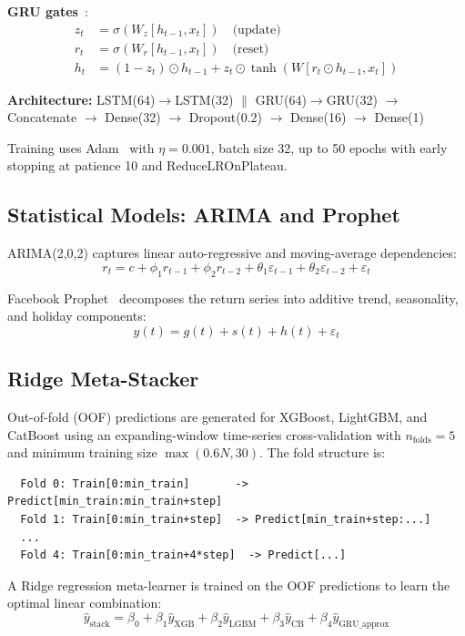\documentclass[10pt,a4paper,twoside]{article}
\begin{document}
\textbf{GRU gates}~\cite{cho2014}:
\begin{align}
  z_t &= \sigma(W_z [h_{t-1}, x_t]) \quad\text{(update)} \\
  r_t &= \sigma(W_r [h_{t-1}, x_t]) \quad\text{(reset)} \\
  h_t &= (1-z_t) \odot h_{t-1} + z_t \odot \tanh(W[r_t \odot h_{t-1}, x_t])
\end{align}

\textbf{Architecture:}
LSTM(64)$\to$LSTM(32) $\|$ GRU(64)$\to$GRU(32) $\to$ Concatenate $\to$ Dense(32) $\to$ Dropout(0.2) $\to$ Dense(16) $\to$ Dense(1)

Training uses Adam~\cite{kingma2015} with $\eta = 0.001$, batch size 32, up to 50 epochs with
early stopping at patience 10 and ReduceLROnPlateau.

\subsection{Statistical Models: ARIMA and Prophet}

ARIMA(2,0,2) captures linear auto-regressive and moving-average dependencies:
\begin{equation}
  r_t = c + \phi_1 r_{t-1} + \phi_2 r_{t-2}
          + \theta_1 \varepsilon_{t-1} + \theta_2 \varepsilon_{t-2} + \varepsilon_t
\end{equation}

Facebook Prophet~\cite{taylor2018} decomposes the return series into additive
trend, seasonality, and holiday components:
\begin{equation}
  y(t) = g(t) + s(t) + h(t) + \varepsilon_t
\end{equation}

\subsection{Ridge Meta-Stacker}

Out-of-fold (OOF) predictions are generated for XGBoost, LightGBM, and CatBoost
using an expanding-window time-series cross-validation with $n_{\text{folds}}=5$
and minimum training size $\max(0.6N, 30)$. The fold structure is:
{\small
\begin{verbatim}
  Fold 0: Train[0:min_train]       -> Predict[min_train:min_train+step]
  Fold 1: Train[0:min_train+step]  -> Predict[min_train+step:...]
  ...
  Fold 4: Train[0:min_train+4*step]  -> Predict[...]
\end{verbatim}
}

A Ridge regression meta-learner is trained on the OOF predictions to learn the
optimal linear combination:
\begin{equation}
  \hat{y}_{\text{stack}} = \beta_0 + \beta_1 \hat{y}_{\text{XGB}}
  + \beta_2 \hat{y}_{\text{LGBM}} + \beta_3 \hat{y}_{\text{CB}}
  + \beta_4 \hat{y}_{\text{GRU\_approx}}
\end{equation}
\end{document}
